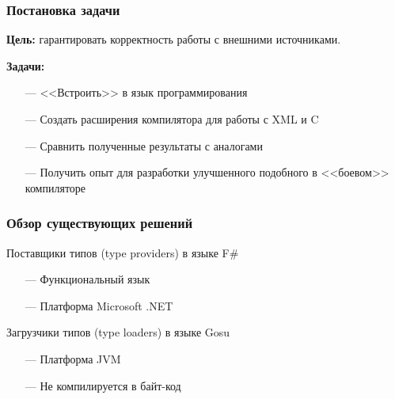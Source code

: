 \documentclass[12pt]{beamer}
\newcommand{\nl}{\vspace{\baselineskip}}
\begin{document}
\begin{frame}\frametitle{Постановка задачи}
    \linespread{1.2}
    \textbf{Цель:} гарантировать корректность работы с внешними источниками.

    \textbf{Задачи:}
    \begin{itemize}
        \item[---] {<<Встроить>>} в язык программирования
        \item[---] Создать расширения компилятора для работы с XML и C
        \item[---] Сравнить полученные результаты с аналогами
        \item[---] Получить опыт для разработки улучшенного подобного в {<<боевом>>} компиляторе
    \end{itemize}


    \linespread{1}
\end{frame}

\begin{frame}\frametitle{Обзор существующих решений} %
    Поставщики типов (type providers) в языке F\#
    \begin{itemize}
        \item[---] Функциональный язык
        \item[---] Платформа Microsoft .NET
    \end{itemize}
    \nl
    Загрузчики типов (type loaders) в языке Gosu
    \begin{itemize}
        \item[---] Платформа JVM
        \item[---] Не компилируется в байт-код
    \end{itemize}
\end{frame}
\end{document}
